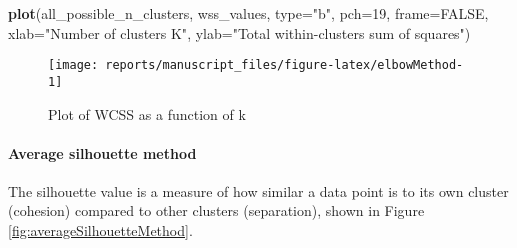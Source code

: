 \documentclass[9pt,a4paper,]{extarticle}
\newenvironment{Shaded}{\begin{snugshade}}{\end{snugshade}}
\newcommand{\DataTypeTok}[1]{\textcolor[rgb]{0.13,0.29,0.53}{#1}}
\newcommand{\DecValTok}[1]{\textcolor[rgb]{0.00,0.00,0.81}{#1}}
\newcommand{\KeywordTok}[1]{\textcolor[rgb]{0.13,0.29,0.53}{\textbf{#1}}}
\newcommand{\NormalTok}[1]{#1}
\newcommand{\OtherTok}[1]{\textcolor[rgb]{0.56,0.35,0.01}{#1}}
\newcommand{\StringTok}[1]{\textcolor[rgb]{0.31,0.60,0.02}{#1}}
\begin{document}
\begin{Shaded}
\begin{Highlighting}[]
\KeywordTok{plot}\NormalTok{(all_possible_n_clusters, wss_values,}
     \DataTypeTok{type=}\StringTok{"b"}\NormalTok{, }\DataTypeTok{pch=}\DecValTok{19}\NormalTok{, }\DataTypeTok{frame=}\OtherTok{FALSE}\NormalTok{, }
     \DataTypeTok{xlab=}\StringTok{"Number of clusters K"}\NormalTok{,}
     \DataTypeTok{ylab=}\StringTok{"Total within-clusters sum of squares"}\NormalTok{)}
\end{Highlighting}
\end{Shaded}

\begin{figure}[H]

{\centering \texttt{[image: reports/manuscript\_files/figure-latex/elbowMethod-1]} 

}

\caption{Plot of WCSS as a function of k}\label{fig:elbowMethod}
\end{figure}

\hypertarget{average-silhouette-method}{%
\paragraph{Average silhouette method}\label{average-silhouette-method}}

The silhouette value is a measure of how similar a data point is to its own
cluster (cohesion) compared to other clusters (separation), shown in Figure \ref{fig:averageSilhouetteMethod}.
\end{document}
